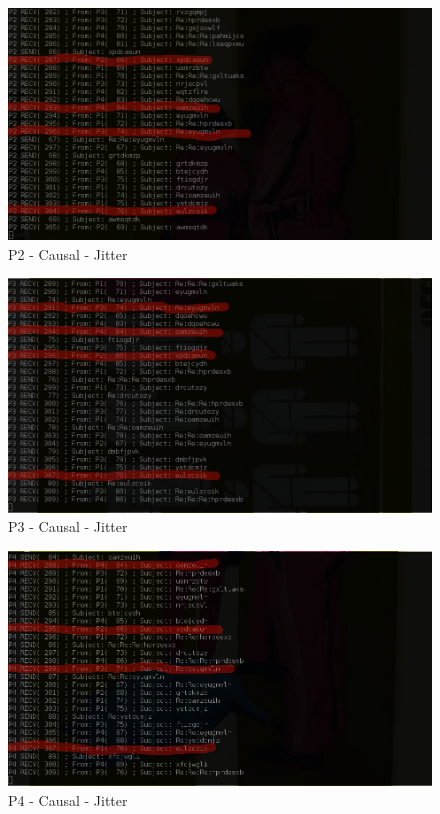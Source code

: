 \begin{figure}[h!]
\centering
\includegraphics[scale=0.4]{sections/screenshots/causal_p2.png}
\caption{P2 - Causal - Jitter}
\label{fig:p2_causal_jitter}
\end{figure}

\begin{figure}[h!]
\centering
\includegraphics[scale=0.4]{sections/screenshots/causal_p3.png}
\caption{P3 - Causal - Jitter}
\label{fig:p3_causal_jitter}
\end{figure}

\begin{figure}[h!]
\centering
\includegraphics[scale=0.4]{sections/screenshots/causal_p4.png}
\caption{P4 - Causal - Jitter}
\label{fig:p4_causal_jitter}
\end{figure}


